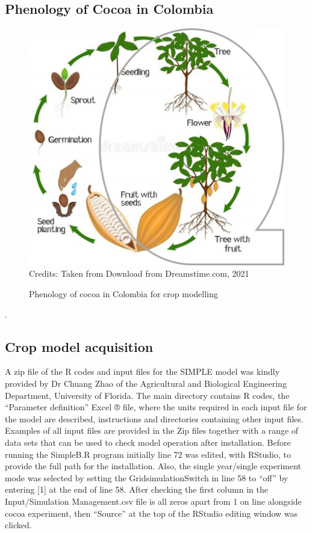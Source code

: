 \documentclass[gene,journal,article,submit,moreauthors,pdftex]{Definitions/mdpi}
\begin{document}
\subsection{Phenology of Cocoa in Colombia}
\begin{figure}[h]
	\centering
	\caption{\footnotesize {Phenology of cocoa in Colombia for crop modelling}} 
	\includegraphics[scale=0.4]{images/phenology.png}\\
	\footnotesize{Credits: Taken from Download from Dreamstime.com, 2021}
	\label{fig:pheno}
\end{figure}.

\subsection{Crop model acquisition}

A zip file of the R codes and input files for the SIMPLE model was kindly provided by Dr Chuang Zhao of the Agricultural and Biological Engineering Department, University of Florida. The main directory contains R codes, the “Parameter definition” Excel ® file, where the units required in each input file for the model are described, instructions and directories containing other input files. Examples of all input files are provided in the Zip files together with a range of data sets that can be used to check model operation after installation. Before running the SimpleB.R program initially line 72 was edited, with RStudio, to provide the full path for the installation. Also, the single year/single experiment mode was selected by setting the GridsimulationSwitch in line 58 to “off” by entering [1] at the end of line 58. After checking the first column in the Input/Simulation Management.csv file is all zeros apart from 1 on line alongside cocoa experiment, then “Source” at the top of the RStudio editing window was clicked. 
\end{document}
